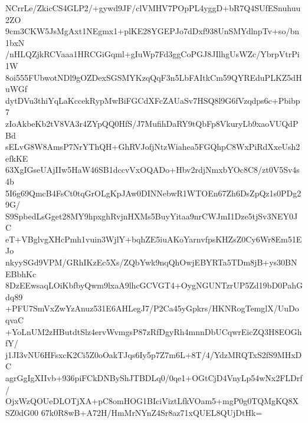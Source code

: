 NCrrLe/ZkicCS4GLP2/+gywd9JF/clVMHV7POpPL4yggD+bR7Q4SUfESnuhuu2ZO
9cm3CKW5JsMgAxt1NEgmx1+plKE28YGEPJo7dDxf938UnSMYdlnpTv+so/bn1bxN
/nHLQZjkRCVaaa1HRCGiGqml+gIuWp7Fd3ggCoPGJ8JIlhgUsWZc/YbrpVtrPi1W
8oi555FUbwotNDl9gOZDexSGSMYKzqQqF3n5LbFAItkCm59QYREduPLKZ5dHuWGf
dytDVu3thiYqLaKccekRypMwBiFGCdXFcZAUaSv7HSQ8l9G6fVzqdps6c+Pbibp7
zIoAkbeKb2tV8VA3r4ZYpQQ0HfS/J7MufihDaRY9tQbFp8VkuryLb9xaoVUQdPBd
sELvG8W8AmsP7NrYThQH+GhRVJofjNtzWiahea5FGQhpC8WxPiRdXxeUsh2efkKE
63XgIGseUAjIIw5HaW46SB1dccvVxOQADo+Hbv2rdjNmxbYOc8C8/zt0V5Sv4s4b
5I6g69QmcB4FsCt0tqGrOLgKpJAw0DINNebwR1WTOEn67Zh6DsZpQz1s0PDg29G/
S9SpbedLsGget28MY9hpxghRvjnHXMs5BuyYitaa9nrCWJmI1Dze5tjSv3NEY0JC
eT+VBglvgXHcPmh1vuin3WjlY+bqhZE5iuAKoYarnvfpsKHZsZ0Cy6Wr8Em51EJo
nkyySGd9VPM/GRhIKzEc5Xs/ZQbYwk9nqQhOwjEBYRTa5TDm8jB+ys30BNEBbhKc
8DzEEwsaqLOiKbfbyQwm9lxaA9lhcGCVGT4+OygNGUNTzrUP5Zd19bD0PahGdq89
+PFU7SmVxZwYzAnuz531E6AHLegJ7/P2Ca45yGpkrs/HKNRogTemglX/UuDoqvaC
+YoLnUM2zHButdtSlz4ervWvmgsP87zRfDgyRh4mnnDbUCqwrEicZQ3H8EOGhfY/
j1JI3vNU6HFsxcK2Ci5Z0oOakTJqs6Iy5p7Z7m6L+8T/4/YdzMRQTxS2fS9MHxDC
agrGgIgXIIvb+936piFCkDNByShJTBDLq0/0qe1+OGtCjD4VnyLp54wNx2FLDrf/
OjxWzQOUeDLOTjXA+pC8omHOG1BIciViztLfkVOam5+mgP0g0TQMgKQ8XSZ0dG00
67k0R8wB+A72H/HmMrNYnZ4Sr8az71xQUEL8QUjDtHk=
